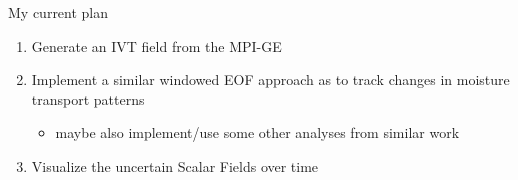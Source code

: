 \begin{frame}{My current plan}

  \begin{enumerate}
    \item Generate an IVT field from the MPI-GE
    \item Implement a similar windowed EOF approach as \cite{vietinghoff_visual_2021} to track changes in moisture transport patterns
      \begin{itemize}
        \item maybe also implement/use some other analyses from similar work 
      \end{itemize}
    \item Visualize the uncertain Scalar Fields over time
  \end{enumerate}
  
\end{frame}
